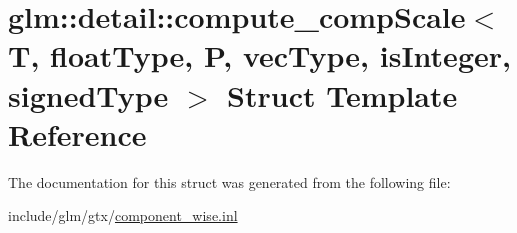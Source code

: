 \hypertarget{structglm_1_1detail_1_1compute__compScale}{}\section{glm\+:\+:detail\+:\+:compute\+\_\+comp\+Scale$<$ T, float\+Type, P, vec\+Type, is\+Integer, signed\+Type $>$ Struct Template Reference}
\label{structglm_1_1detail_1_1compute__compScale}


The documentation for this struct was generated from the following file\+:\begin{DoxyCompactItemize}
\item 
include/glm/gtx/\hyperlink{component__wise_8inl}{component\+\_\+wise.\+inl}\end{DoxyCompactItemize}
